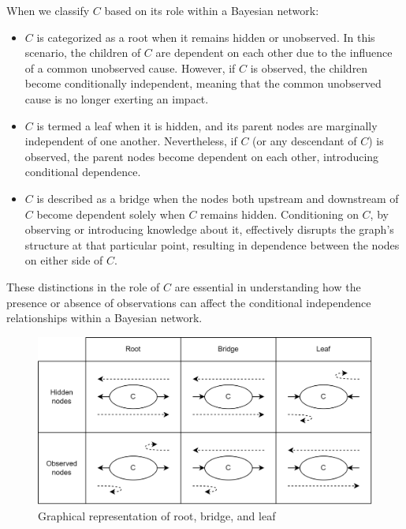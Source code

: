 When we classify $C$ based on its role within a Bayesian network:
\begin{itemize}
    \item $C$ is categorized as a root when it remains hidden or unobserved. 
        In this scenario, the children of $C$ are dependent on each other due to the influence of a common unobserved cause. 
        However, if $C$ is observed, the children become conditionally independent, meaning that the common unobserved cause is no longer exerting an impact.
    \item $C$ is termed a leaf when it is hidden, and its parent nodes are marginally independent of one another. 
        Nevertheless, if $C$ (or any descendant of $C$) is observed, the parent nodes become dependent on each other, introducing conditional dependence.
    \item $C$ is described as a bridge when the nodes both upstream and downstream of $C$ become dependent solely when $C$ remains hidden. 
        Conditioning on $C$, by observing or introducing knowledge about it, effectively disrupts the graph's structure at that particular point, resulting in dependence between the nodes on either side of $C$.
\end{itemize}
These distinctions in the role of $C$ are essential in understanding how the presence or absence of observations can affect the conditional independence relationships within a Bayesian network.
\begin{figure}[H]
    \centering
    \includegraphics[width=0.75\linewidth]{images/def.png}
    \caption{Graphical representation of root, bridge, and leaf}
\end{figure}

